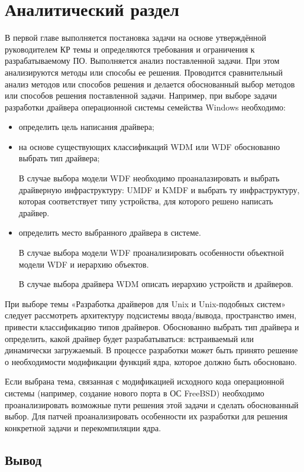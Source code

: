 \chapter{Аналитический раздел}

В первой главе выполняется постановка задачи на основе утверждённой руководителем КР темы и определяются требования и ограничения к разрабатываемому ПО.
Выполняется анализ поставленной задачи.
При этом анализируются методы или способы ее решения.
Проводится сравнительный анализ методов или способов решения и делается обоснованный выбор методов или способов решения поставленной задачи.
Например, при выборе задачи разработки драйвера операционной системы семейства Windows необходимо:
\begin{itemize}
	\item определить цель написания драйвера;
	\item на основе существующих классификаций WDM или WDF обоснованно выбрать тип драйвера;

	В случае выбора модели WDF необходимо проаналазировать и выбрать драйверную инфраструктуру: UMDF и KMDF и выбрать ту инфраструктуру, которая соответствует типу устройства, для которого решено написать драйвер.

	\item определить место выбранного драйвера в системе.

	В случае выбора модели WDF проанализировать особенности объектной модели WDF и иерархию объектов.

	В случае выбора драйвера WDM описать иерархию устройств и драйверов.
\end{itemize}

При выборе темы «Разработка драйверов для Unix и Unix-подобных систем» следует рассмотреть архитектуру подсистемы ввода/вывода, пространство имен, привести классификацию типов драйверов.
Обоснованно выбрать тип драйвера и определить, какой драйвер будет разрабатываться: встраиваемый или динамически загружаемый.
В процессе разработки может быть принято решение о необходимости модификации функций ядра, которое должно быть обосновано.

Если выбрана тема, связанная с модификацией исходного кода операционной системы (например, создание нового порта в ОС FreeBSD) необходимо проанализировать возможные
пути решения этой задачи и сделать обоснованный выбор.
Для патчей проанализировать особенности их разработки для решения конкретной задачи и перекомпиляции ядра.

\section*{Вывод}
